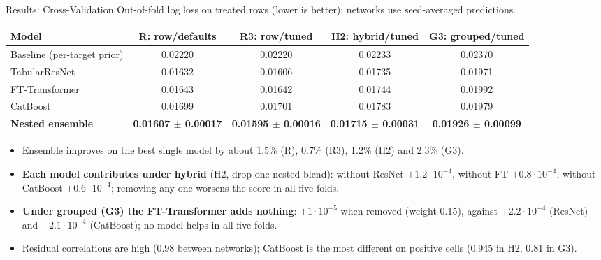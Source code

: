 \documentclass[aspectratio=169,10pt]{beamer}
\begin{document}
\begin{frame}{Results: Cross-Validation}
\small
Out-of-fold log loss on treated rows (lower is better); networks use seed-averaged predictions.
\vspace{0.2em}

\centering
\footnotesize
\begin{tabular}{lcccc}
\toprule
\textbf{Model} & \textbf{R: row/defaults} & \textbf{R3: row/tuned} & \textbf{H2: hybrid/tuned} & \textbf{G3: grouped/tuned}\\
\midrule
Baseline (per-target prior) & 0.02220 & 0.02220 & 0.02233 & 0.02370\\
TabularResNet & 0.01632 & 0.01606 & 0.01735 & 0.01971\\
FT-Transformer & 0.01643 & 0.01642 & 0.01744 & 0.01992\\
CatBoost & 0.01699 & 0.01701 & 0.01783 & 0.01979\\
\midrule
\textbf{Nested ensemble} & \textbf{0.01607 $\pm$ 0.00017} & \textbf{0.01595 $\pm$ 0.00016} & \textbf{0.01715 $\pm$ 0.00031} & \textbf{0.01926 $\pm$ 0.00099}\\
\bottomrule
\end{tabular}
\vspace{0.4em}

\raggedright
\small
\begin{itemize}
  \item Ensemble improves on the best single model by about 1.5\% (R), 0.7\% (R3), 1.2\% (H2) and 2.3\% (G3).
  \item \textbf{Each model contributes under hybrid} (H2, drop-one nested blend): without ResNet $+1.2\cdot10^{-4}$, without FT $+0.8\cdot10^{-4}$, without CatBoost $+0.6\cdot10^{-4}$; removing any one worsens the score in all five folds.
  \item \textbf{Under grouped (G3) the FT-Transformer adds nothing}: $+1\cdot10^{-5}$ when removed (weight 0.15), against $+2.2\cdot10^{-4}$ (ResNet) and $+2.1\cdot10^{-4}$ (CatBoost); no model helps in all five folds.
  \item Residual correlations are high (0.98 between networks); CatBoost is the most different on positive cells (0.945 in H2, 0.81 in G3).
\end{itemize}
\end{frame}
\end{document}
